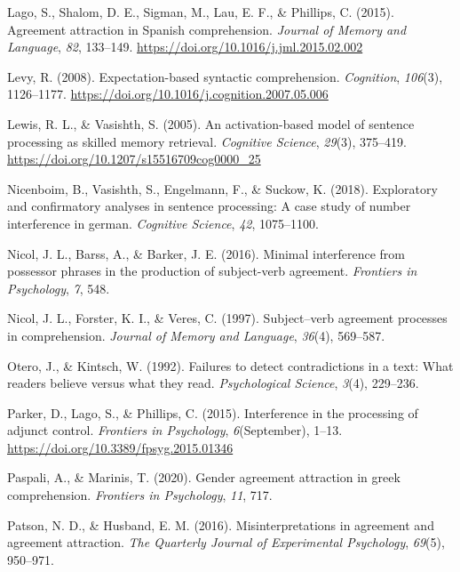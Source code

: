 \documentclass[
  english,
  doc,floatsintext]{apa6}
\newlength{\cslhangindent}
\newenvironment{cslreferences}%
  {\setlength{\parindent}{0pt}%
  \everypar{\setlength{\hangindent}{\cslhangindent}}\ignorespaces}%
  {\par}
\begin{document}
\begin{cslreferences}
\leavevmode\hypertarget{ref-LagoEtAl:2015}{}%
Lago, S., Shalom, D. E., Sigman, M., Lau, E. F., \& Phillips, C. (2015). Agreement attraction in Spanish comprehension. \emph{Journal of Memory and Language}, \emph{82}, 133--149. \url{https://doi.org/10.1016/j.jml.2015.02.002}

\leavevmode\hypertarget{ref-Levy2008}{}%
Levy, R. (2008). Expectation-based syntactic comprehension. \emph{Cognition}, \emph{106}(3), 1126--1177. \url{https://doi.org/10.1016/j.cognition.2007.05.006}

\leavevmode\hypertarget{ref-LewisVasishth2005}{}%
Lewis, R. L., \& Vasishth, S. (2005). An activation-based model of sentence processing as skilled memory retrieval. \emph{Cognitive Science}, \emph{29}(3), 375--419. \url{https://doi.org/10.1207/s15516709cog0000_25}

\leavevmode\hypertarget{ref-NicenboimEtAl:2018}{}%
Nicenboim, B., Vasishth, S., Engelmann, F., \& Suckow, K. (2018). Exploratory and confirmatory analyses in sentence processing: A case study of number interference in german. \emph{Cognitive Science}, \emph{42}, 1075--1100.

\leavevmode\hypertarget{ref-NicolEtAl:2016}{}%
Nicol, J. L., Barss, A., \& Barker, J. E. (2016). Minimal interference from possessor phrases in the production of subject-verb agreement. \emph{Frontiers in Psychology}, \emph{7}, 548.

\leavevmode\hypertarget{ref-Nicoletal:1997}{}%
Nicol, J. L., Forster, K. I., \& Veres, C. (1997). Subject--verb agreement processes in comprehension. \emph{Journal of Memory and Language}, \emph{36}(4), 569--587.

\leavevmode\hypertarget{ref-OteroKintsch:1992}{}%
Otero, J., \& Kintsch, W. (1992). Failures to detect contradictions in a text: What readers believe versus what they read. \emph{Psychological Science}, \emph{3}(4), 229--236.

\leavevmode\hypertarget{ref-ParkerEtAl:2015}{}%
Parker, D., Lago, S., \& Phillips, C. (2015). Interference in the processing of adjunct control. \emph{Frontiers in Psychology}, \emph{6}(September), 1--13. \url{https://doi.org/10.3389/fpsyg.2015.01346}

\leavevmode\hypertarget{ref-PaspaliMarinis:2020}{}%
Paspali, A., \& Marinis, T. (2020). Gender agreement attraction in greek comprehension. \emph{Frontiers in Psychology}, \emph{11}, 717.

\leavevmode\hypertarget{ref-PatsonHusband:2016}{}%
Patson, N. D., \& Husband, E. M. (2016). Misinterpretations in agreement and agreement attraction. \emph{The Quarterly Journal of Experimental Psychology}, \emph{69}(5), 950--971.


\end{cslreferences}
\end{document}

